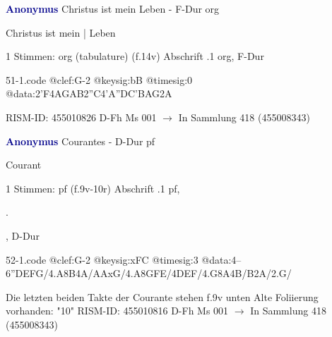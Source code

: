 \documentclass[twocolumn]{book}
\begin{document}
\newline \par \vspace{7pt} \textcolor{darkblue}{\textbf{Anonymus  }}
\newline Christus ist mein Leben - F-Dur
\newline org
\newline \begin{itshape}[f.14v, at left:] Christus ist mein | Leben\end{itshape} 
\newline \textcolor{darkblue}{}  1 Stimmen: org (tabulature)  (f.14v)
\newline Abschrift
.1  org, F-Dur  
\begin{filecontents*}{51-1.code}
@clef:G-2
@keysig:bB
@timesig:0
@data:2'F4AGAB2''C4'A''DC'BAG2A
\end{filecontents*}
\newline
%
\newline RISM-ID: 455010826
\newline D-Fh  Ms 001
\newline $\rightarrow$ In Sammlung 418 (455008343)
      
\newline \par \vspace{7pt} \textcolor{darkblue}{\textbf{Anonymus  }}
\newline Courantes - D-Dur
\newline pf
\newline \begin{itshape}[f.10r, at left:] Courant\end{itshape} 
\newline \textcolor{darkblue}{}  1 Stimmen: pf  (f.9v-10r)
\newline Abschrift
.1  pf, \begin{itshape}[15.].\end{itshape}, D-Dur  
\begin{filecontents*}{52-1.code}
@clef:G-2
@keysig:xFC
@timesig:3
@data:4--{6''DEFG}/4.A8B4A/AAxG/4.A{8GFE}/4DEF/4.G8A4B/B2A/2.G/
\end{filecontents*}
\newline
%
\newline Die letzten beiden Takte der Courante stehen f.9v unten
\newline Alte Foliierung vorhanden: "10"
\newline RISM-ID: 455010816
\newline D-Fh  Ms 001
\newline $\rightarrow$ In Sammlung 418 (455008343)
      
\end{document}
